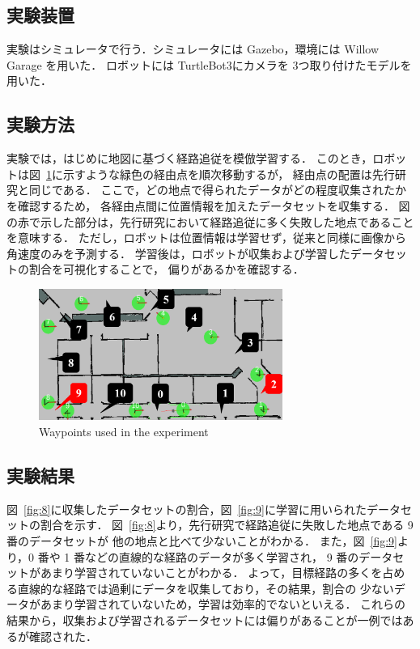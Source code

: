 \documentclass{jarticle}
\renewcommand{\figurename}{図~}
\newcommand{\figref}[1]{\figurename\ref{#1}}
\begin{document}
\subsection{実験装置}
実験はシミュレータで行う．シミュレータには Gazebo\cite{gazebo}，環境には Willow Garage を用いた．
ロボットには TurtleBot3\cite{TurtleBot3}にカメラを 3つ取り付けたモデルを用いた．

\subsection{実験方法}
実験では，はじめに地図に基づく経路追従を模倣学習する．
このとき，ロボットは\figref{fig:6}に示すような緑色の経由点を順次移動するが，
経由点の配置は先行研究と同じである．
ここで，どの地点で得られたデータがどの程度収集されたかを確認するため，
各経由点間に位置情報を加えたデータセットを収集する．
図の赤で示した部分は，先行研究において経路追従に多く失敗した地点であることを意味する．
ただし，ロボットは位置情報は学習せず，従来と同様に画像から角速度のみを予測する．
学習後は，ロボットが収集および学習したデータセットの割合を可視化することで，
偏りがあるかを確認する．

\begin{figure}[h!]
  \centering
   \includegraphics[height=43mm]{./png/location.png}
   \caption{Waypoints used in the experiment}
   \label{fig:6}
\end{figure}

\subsection{実験結果}
\figref{fig:8}に収集したデータセットの割合，\figref{fig:9}に学習に用いられたデータセットの割合を示す．
\figref{fig:8}より，先行研究で経路追従に失敗した地点である 9 番のデータセットが
他の地点と比べて少ないことがわかる．
また，\figref{fig:9}より，0 番や 1 番などの直線的な経路のデータが多く学習され，
9 番のデータセットがあまり学習されていないことがわかる．
よって，目標経路の多くを占める直線的な経路では過剰にデータを収集しており，その結果，割合の
少ないデータがあまり学習されていないため，学習は効率的でないといえる．
これらの結果から，収集および学習されるデータセットには偏りがあることが一例ではあるが確認された．
\end{document}
